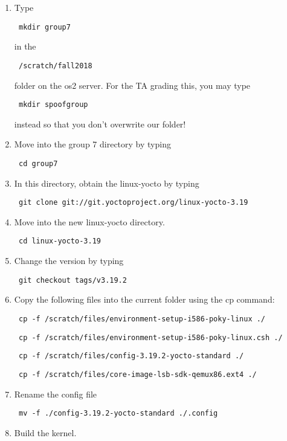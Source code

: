 \documentclass[10pt,english]{article}
\begin{document}
\begin{enumerate}
\item Type \begin{verbatim} mkdir group7 \end{verbatim}  in the \begin{verbatim} /scratch/fall2018 \end{verbatim} folder on the os2 server. For the TA grading this, you may type \begin{verbatim} mkdir spoofgroup \end{verbatim} instead so that you don't overwrite our folder!
\item Move into the group 7 directory by typing \begin{verbatim} cd group7 \end{verbatim}
\item In this directory, obtain the linux-yocto by typing \begin{verbatim} git clone git://git.yoctoproject.org/linux-yocto-3.19 \end{verbatim}
\item Move into the new linux-yocto directory. \begin{verbatim} cd linux-yocto-3.19 \end{verbatim}
\item Change the version by typing \begin{verbatim} git checkout tags/v3.19.2 \end{verbatim}
\item Copy the following files into the current folder using the cp command:
\begin{verbatim} cp -f /scratch/files/environment-setup-i586-poky-linux ./ \end{verbatim} 
\begin{verbatim} cp -f /scratch/files/environment-setup-i586-poky-linux.csh ./ \end{verbatim}
\begin{verbatim} cp -f /scratch/files/config-3.19.2-yocto-standard ./ \end{verbatim}
\begin{verbatim} cp -f /scratch/files/core-image-lsb-sdk-qemux86.ext4 ./ \end{verbatim}
\item Rename the config file
\begin{verbatim} mv -f ./config-3.19.2-yocto-standard ./.config \end{verbatim}
\item Build the kernel.

\end{enumerate}
\end{document}
